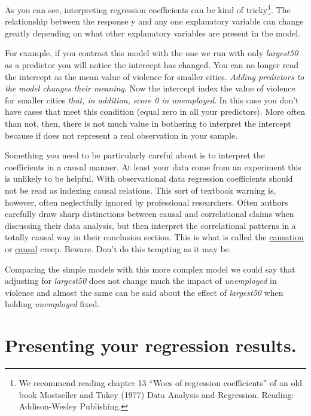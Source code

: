 \documentclass[
]{book}
\begin{document}
As you can see, interpreting regression coefficients can be kind of tricky\footnote{We recommend reading chapter 13 ``Woes of regression coefficients'' of an old book Mostseller and Tukey (1977) Data Analysis and Regression. Reading: Addison-Wesley Publishing.}. The relationship between the response y and any one explanatory variable can change greatly depending on what other explanatory variables are present in the model.

For example, if you contrast this model with the one we run with only \emph{largest50} as a predictor you will notice the intercept has changed. You can no longer read the intercept as the mean value of violence for smaller cities. \emph{Adding predictors to the model changes their meaning}. Now the intercept index the value of violence for smaller cities \emph{that, in addition, score 0 in unemployed}. In this case you don't have cases that meet this condition (equal zero in all your predictors). More often than not, then, there is not much value in bothering to interpret the intercept because if does not represent a real observation in your sample.

Something you need to be particularly careful about is to interpret the coefficients in a causal manner. At least your data come from an experiment this is unlikely to be helpful. With observational data regression coefficients should not be read as indexing causal relations. This sort of textbook warning is, however, often neglectfully ignored by professional researchers. Often authors carefully draw sharp distinctions between causal and correlational claims when discussing their data analysis, but then interpret the correlational patterns in a totally causal way in their conclusion section. This is what is called the \href{http://junkcharts.typepad.com/numbersruleyourworld/2012/07/the-causation-creep.html}{causation} or \href{http://www.carlislerainey.com/2012/12/05/another-example-of-causal-creep/}{causal} creep. Beware. Don't do this tempting as it may be.

Comparing the simple models with this more complex model we could say that adjusting for \emph{largest50} does not change much the impact of \emph{unemployed} in violence and almost the same can be said about the effect of \emph{largest50} when holding \emph{unemployed} fixed.

\section{Presenting your regression results.}\label{presenting-your-regression-results.}
\end{document}
